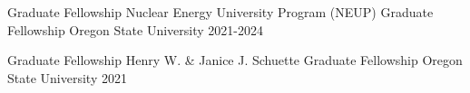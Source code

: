 

    
    
    
    






\begin{cvhonors}

    \cvhonor
    {Graduate Fellowship}%
    {Nuclear Energy University Program (NEUP) Graduate Fellowship}%
    {Oregon State University}%
    {2021-2024}%
    
    \cvhonor
    {Graduate Fellowship}%
    {Henry W. \& Janice J. Schuette Graduate Fellowship}%
    {Oregon State University}%
    {2021}%

\end{cvhonors}